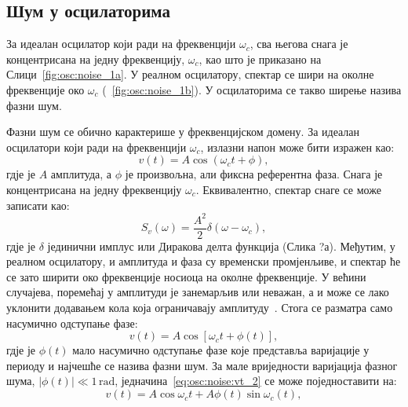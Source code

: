 \documentclass[master]{finthesis}
\begin{document}
\subsection{Шум у осцилаторима} \label{section:osc:noise}
За идеалан осцилатор који ради на фреквенцији $\omega_{c}$, сва његова снага је концентрисана на једну фреквенцију, $\omega_{c}$, као што је приказано на Слици~\ref{fig:osc:noise_1a}. У реалном осцилатору, спектар се шири на околне фреквенције око $\omega_{c}$ (\figurename~\ref{fig:osc:noise_1b}). У осцилаторима се такво ширење назива фазни шум. \par

Фазни шум се обично карактерише у фреквенцијском домену. За идеалан осцилатори који ради на фреквенцији $\omega_{c}$, излазни напон може бити изражен као:
\begin{equation}
	\label{eq:osc:noise:vt_1}
	v(t) = A\cos(\omega_{c}t + \phi),
\end{equation}
гдје је $A$ амплитуда, а $\phi$ је произвољна, али фиксна референтна фаза. Снага је концентрисана на једну фреквенцију $\omega_{c}$. Еквивалентно, спектар снаге се може записати као:
\begin{equation}
	\label{eq:osc:noise:sv_1}
	S_{v}(\omega) = \frac{A^{2}}{2}\delta (\omega - \omega_{c}),
\end{equation}
гдје је $\delta$ јединични имплус или Диракова делта функција (Слика ?а). Међутим, у реалном осцилатору, и амплитуда и фаза су временски промјенљиве, и спектар ће се зато ширити око фреквенције носиоца на околне фреквенције. У већини случајева, поремећај у амплитуди је занемарљив или неважан, а и може се лако уклонити додавањем кола која ограничавају амплитуду~\cite{Staszewski:FREQUENCY_SYNTHESIZER_CMOS_2005}. Стога се разматра само насумично одступање фазе:
\begin{equation}
	\label{eq:osc:noise:vt_2}
	v(t) = A\cos[\omega_{c}t + \phi (t)],
\end{equation}
гдје је $\phi (t)$ мало насумично одступање фазе које представља варијације у периоду и најчешће се назива фазни шум. За мале вриједности варијација фазног шума, $|\phi (t)| \ll 1\,\text{rad}$, једначина~\ref{eq:osc:noise:vt_2} се може поједноставити на:
\begin{equation}
	\label{eq:osc:noise:vt_3}
	v(t) = A\cos\omega_{c}t + A\phi (t)\sin\omega_{c}(t),
\end{equation}
\end{document}
